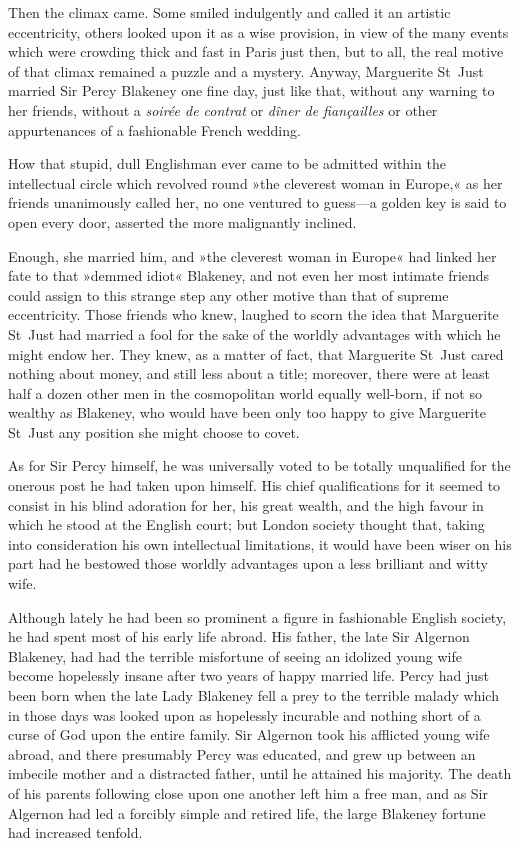 Then the climax came. Some smiled indulgently and called it an artistic eccentricity, others looked upon it as a wise provision, in view of the many events which were crowding thick and fast in Paris just then, but to all, the real motive of that climax remained a puzzle and a mystery. Anyway, Marguerite St~Just married Sir Percy Blakeney one fine day, just like that, without any warning to her friends, without a \textit{soirée de contrat} or \textit{dîner de fiançailles} or other appurtenances of a fashionable French wedding.

How that stupid, dull Englishman ever came to be admitted within the intellectual circle which revolved round »the cleverest woman in Europe,« as her friends unanimously called her, no one ventured to guess\allowbreak---\allowbreak a golden key is said to open every door, asserted the more malignantly inclined.

Enough, she married him, and »the cleverest woman in Europe« had linked her fate to that »demmed idiot« Blakeney, and not even her most intimate friends could assign to this strange step any other motive than that of supreme eccentricity. Those friends who knew, laughed to scorn the idea that Marguerite St~Just had married a fool for the sake of the worldly advantages with which he might endow her. They knew, as a matter of fact, that Marguerite St~Just cared nothing about money, and still less about a title; moreover, there were at least half a dozen other men in the cosmopolitan world equally well-born, if not so wealthy as Blakeney, who would have been only too happy to give Marguerite St~Just any position she might choose to covet.

As for Sir Percy himself, he was universally voted to be totally unqualified for the onerous post he had taken upon himself. His chief qualifications for it seemed to consist in his blind adoration for her, his great wealth, and the high favour in which he stood at the English court; but London society thought that, taking into consideration his own intellectual limitations, it would have been wiser on his part had he bestowed those worldly advantages upon a less brilliant and witty wife.

Although lately he had been so prominent a figure in fashionable English society, he had spent most of his early life abroad. His father, the late Sir Algernon Blakeney, had had the terrible misfortune of seeing an idolized young wife become hopelessly insane after two years of happy married life. Percy had just been born when the late Lady Blakeney fell a prey to the terrible malady which in those days was looked upon as hopelessly incurable and nothing short of a curse of God upon the entire family. Sir Algernon took his afflicted young wife abroad, and there presumably Percy was educated, and grew up between an imbecile mother and a distracted father, until he attained his majority. The death of his parents following close upon one another left him a free man, and as Sir Algernon had led a forcibly simple and retired life, the large Blakeney fortune had increased tenfold.

